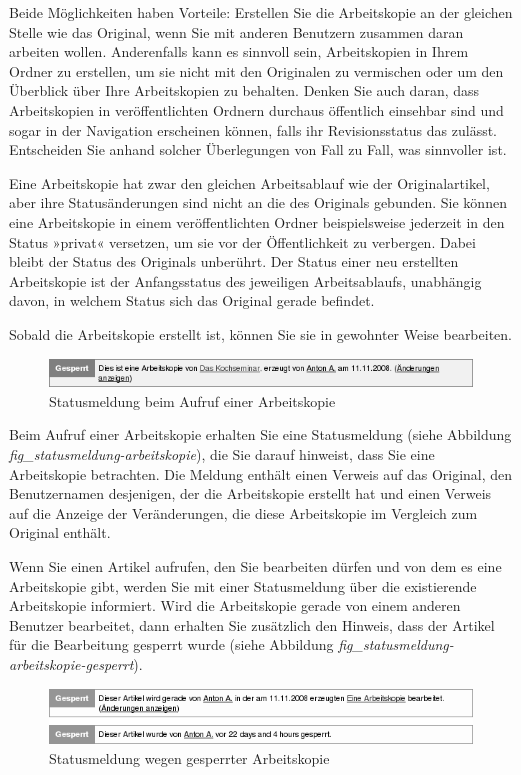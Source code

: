 \documentclass[a4paper,12pt,ngerman]{manual}
\begin{document}
Beide Möglichkeiten haben Vorteile: Erstellen Sie die Arbeitskopie an
der gleichen Stelle wie das Original, wenn Sie mit anderen Benutzern
zusammen daran arbeiten wollen. Anderenfalls kann es sinnvoll sein,
Arbeitskopien in Ihrem Ordner zu erstellen, um sie nicht mit den
Originalen zu vermischen oder um den Überblick über Ihre Arbeitskopien
zu behalten. Denken Sie auch daran, dass Arbeitskopien in
veröffentlichten Ordnern durchaus öffentlich einsehbar sind und sogar
in der Navigation erscheinen können, falls ihr Revisionsstatus das
zulässt. Entscheiden Sie anhand solcher Überlegungen von Fall zu Fall,
was sinnvoller ist.

Eine Arbeitskopie hat zwar den gleichen Arbeitsablauf wie der
Originalartikel, aber ihre Statusänderungen sind nicht an die des
Originals gebunden. Sie können eine Arbeitskopie in einem
veröffentlichten Ordner beispielsweise jederzeit in den Status
»privat« versetzen, um sie vor der Öffentlichkeit zu verbergen. Dabei
bleibt der Status des Originals unberührt. Der Status einer neu
erstellten Arbeitskopie ist der Anfangsstatus des jeweiligen
Arbeitsablaufs, unabhängig davon, in welchem Status sich das Original
gerade befindet.

Sobald die Arbeitskopie erstellt ist, können Sie sie in gewohnter
Weise bearbeiten.
\begin{figure}[htbp]
\centering

\includegraphics{statusmeldung-arbeitskopie.png}
\caption{Statusmeldung beim Aufruf einer Arbeitskopie}\end{figure}

Beim Aufruf einer Arbeitskopie erhalten Sie eine Statusmeldung (siehe
Abbildung \emph{fig\_statusmeldung-arbeitskopie}), die Sie darauf
hinweist, dass Sie eine Arbeitskopie betrachten. Die Meldung enthält
einen Verweis auf das Original, den Benutzernamen desjenigen, der die
Arbeitskopie erstellt hat und einen Verweis auf die Anzeige der
Veränderungen, die diese Arbeitskopie im Vergleich zum Original
enthält.

Wenn Sie einen Artikel aufrufen, den Sie bearbeiten dürfen und von dem
es eine Arbeitskopie gibt, werden Sie mit einer Statusmeldung über die
existierende Arbeitskopie informiert. Wird die Arbeitskopie gerade von
einem anderen Benutzer bearbeitet, dann erhalten Sie zusätzlich den
Hinweis, dass der Artikel für die Bearbeitung gesperrt wurde (siehe
Abbildung \emph{fig\_statusmeldung-arbeitskopie-gesperrt}).
\begin{figure}[htbp]
\centering

\includegraphics{statusmeldung-gesperrt-arbeitskopie.png}
\caption{Statusmeldung wegen gesperrter Arbeitskopie}\end{figure}
\hypertarget{sec-orig-durch-arbe}{}
\end{document}
